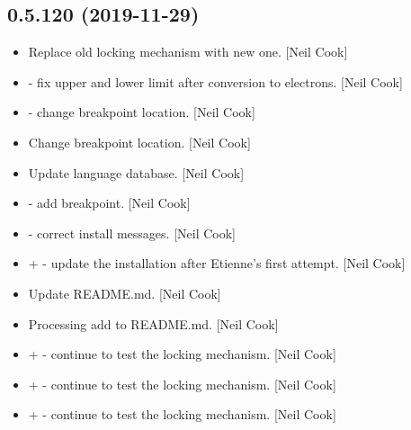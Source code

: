 \documentclass[a4paper,10pt,english]{report}
\begin{document}
\subsection{0.5.120 (2019-11-29)}
\label{\detokenize{misc/changelog:id22}}\begin{itemize}
\item {} 
Replace old locking mechanism with new one. {[}Neil Cook{]}

\item {} 
 - fix upper and lower limit after conversion
to electrons. {[}Neil Cook{]}

\item {} 
 - change breakpoint location. {[}Neil
Cook{]}

\item {} 
Change breakpoint location. {[}Neil Cook{]}

\item {} 
Update language database. {[}Neil Cook{]}

\item {} 
 - add breakpoint. {[}Neil Cook{]}

\item {} 
 - correct install messages.
{[}Neil Cook{]}

\item {} 
 +  -
update the installation after Etienne’s first attempt. {[}Neil Cook{]}

\item {} 
Update README.md. {[}Neil Cook{]}

\item {} 
Processing add to README.md. {[}Neil Cook{]}

\item {} 
 +  - continue to test the locking mechanism. {[}Neil
Cook{]}

\item {} 
 +  - continue to test the locking mechanism. {[}Neil
Cook{]}

\item {} 
 +  - continue to test the locking mechanism. {[}Neil
Cook{]}


\end{itemize}
\end{document}
